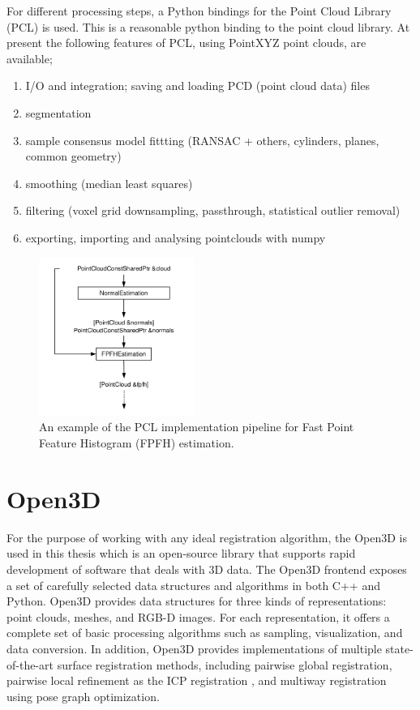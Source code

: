 For different processing steps, a Python bindings for the Point Cloud Library (PCL) is used. This is a reasonable python binding to the point cloud library. At present the following features of PCL, using PointXYZ point clouds, are available;

\begin{enumerate}
    \item I/O and integration; saving and loading PCD (point cloud data) files
    \item segmentation
    \item sample consensus model fittting (RANSAC + others, cylinders, planes, common geometry)
    \item smoothing (median least squares)
    \item filtering (voxel grid downsampling, passthrough, statistical outlier removal)
    \item exporting, importing and analysing pointclouds with numpy
\end{enumerate}

\begin{figure}[!h]
\begin{center}
\includegraphics[width=2in]{figures02/pcl1.png}
\caption{An  example  of  the  PCL  implementation  pipeline  for  Fast  Point Feature Histogram (FPFH) \cite{fpfh} estimation.}
\end{center}
\end{figure}


\section{Open3D}

For the purpose of working with any ideal registration algorithm, the Open3D is used in this thesis which is an open-source library that supports rapid development of software that deals with 3D data. The Open3D frontend exposes a set of carefully selected data structures and algorithms in both C++ and Python. Open3D provides data structures for three kinds of representations: point clouds, meshes, and RGB-D images.  For each representation, it offers a complete set of basic processing algorithms such as sampling, visualization, and data conversion. In addition, Open3D  provides  implementations  of  multiple  state-of-the-art surface registration methods, including pairwise global registration, pairwise local refinement as the ICP registration \cite{icp}, and multiway registration  using  pose  graph  optimization. 

